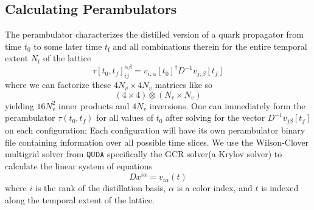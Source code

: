 \subsection{Calculating Perambulators}
The perambulator characterizes the distilled version of a quark propagator from time $t_0$ to some later time $t_{\text{f}}$ and all combinations therein for the entire temporal extent $N_t$ of the lattice \cite{peardon_novel_2009}
\begin{equation}
  \tau[t_0,t_f]_{ij}^{\alpha\beta} = v_{i,\alpha}[t_0]^{\dagger} D^{-1}v_{j,\beta}[t_f]
\end{equation} where we can factorize these $4N_v \times 4N_v$ matrices like so 
\begin{equation}
  (4 \times 4) \otimes (N_v \times N_v)
\end{equation} yielding $16N_v^2$ inner products and $4N_v$ inversions. One can immediately form the perambulator $\tau(t_0,t_f)$ for all values of $t_0$ after solving for the vector $D^{-1}v_{j\beta}[t_f]$ on each configuration; Each configuration will have its own perambulator binary file containing information over all possible time slices. We use the Wilson-Clover multigrid solver from $\texttt{QUDA}$ \cite{quda} specifically the GCR solver(a Krylov solver) to calculate the linear system of equations 
\begin{equation}
  Dx^{i\alpha} = v_{i\alpha}(t)
\end{equation} where $i$ is the rank of the distillation basis, $\alpha$ is a color index, and $t$ is indexed along the temporal extent of the lattice. 

